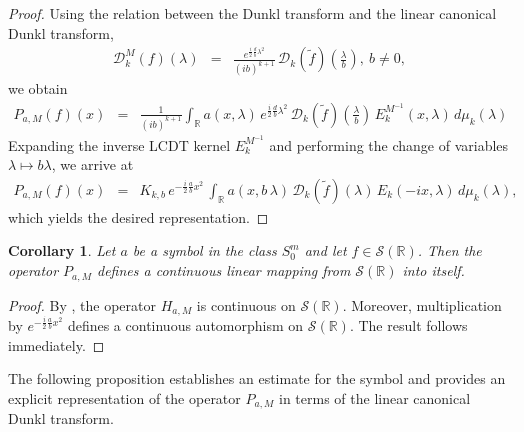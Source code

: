 \documentclass[12pt,a4paper,reqno]{amsproc}
\newtheorem{corollary}[theorem]{Corollary}
\theoremstyle{definition}
\theoremstyle{remark}
\numberwithin{equation}{section}
\begin{document}
\begin{proof}
    Using the relation between the Dunkl transform and the linear canonical Dunkl transform, 
    \begin{eqnarray} \label{LCDT-remark}
 \mathcal{D}_k^M(f)(\lambda) 
 &=& \frac{e^{\frac{i}{2}\frac{d}{b}\lambda^2}}{(ib)^{k+1}}\, \mathcal{D}_k(\tilde{f})\left(\frac{\lambda}{b}\right),~b\neq 0,
\end{eqnarray}
we obtain
\begin{eqnarray*}
P_{a,M}(f)(x) &=& \frac{1}{(ib)^{k+1}} \int_{\mathbb{R}}  a(x,\lambda)\, e^{\frac{i}{2}\frac{d}{b}\lambda^2}\, \mathcal{D}_k(\tilde{f})\left(\frac{\lambda}{b}\right)\, E_k^{M^{-1}}(x,\lambda)\,d\mu_k(\lambda)
\end{eqnarray*}
Expanding the inverse LCDT kernel $E_k^{M^{-1}}$ and performing the change of variables $\lambda \mapsto b\lambda$, we arrive at
\begin{eqnarray*}
P_{a,M}(f)(x) &=& K_{k,b}\, e^{-\frac{i}{2}\frac{a}{b}x^2}\,\int_{\mathbb{R}}  a(x,b\,\lambda)\, \mathcal{D}_k(\tilde{f})(\lambda)\, E_k(-ix,\lambda)\,d\mu_k(\lambda),
\end{eqnarray*}
which yields the desired representation.
\end{proof}
\begin{corollary}\label{C7-T:3.3}
   Let $a$ be a symbol in the class $S_0^m$  and let $f\in \mathcal{S}(\mathbb{R})$. Then the operator $P_{a,M}$ defines a continuous linear mapping from $\mathcal{S}(\mathbb{R})$ into itself.
\end{corollary}
\begin{proof}
    By \cite{Dachraoui}, the operator $H_{a,M}$ is continuous on $\mathcal{S}(\mathbb{R})$. Moreover, multiplication by $e^{-\frac{i}{2}\frac{a}{b}x^2}$ defines a continuous automorphism on $\mathcal{S}(\mathbb{R})$. The result follows immediately.
\end{proof}





The following proposition establishes an estimate for the symbol and provides an explicit representation of the operator $P_{a,M}$ in terms of the linear canonical Dunkl transform.
\end{document}
